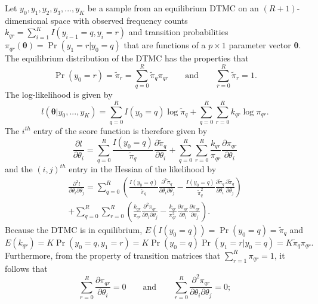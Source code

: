 \documentclass[11pt]{article}
\newcommand{\bs}{\boldsymbol}
\begin{document}
Let $y_0,y_1,y_2,y_3,...,y_K$ be a sample from an equilibrium DTMC on an $(R+1)$-dimensional space with observed frequency counts $k_{qr} = \sum_{i=1}^K I(y_{i-1} = q, y_i = r)$ and transition probabilities $\pi_{qr} (\bs\theta) = \Pr(y_1 = r | y_0 = q)$ that are functions of a $p\times 1$ parameter vector $\bs\theta$. The equilibrium distribution of the DTMC has the properties that
\begin{equation}
\label{eq:balancing_normalizing}
 \Pr(y_0 = r) = \tilde{\pi}_r = \sum_{q=0}^R \tilde{\pi}_q \pi_{qr} \qquad \text{and} \qquad \sum_{r=0}^R \tilde{\pi}_r = 1.
\end{equation}
The log-likelihood is given by 
\begin{equation}
\label{eq:log_lik}
l(\bs\theta | y_0,...,y_K) = \sum_{q=0}^R I(y_0 = q) \log \tilde{\pi}_q + \sum_{q=0}^R \sum_{r=0}^R k_{qr} \log \pi_{qr}.
\end{equation}
The $i^{th}$ entry of the score function is therefore given by
\begin{equation}
\label{eq:score}
\frac{\partial l}{\partial \theta_i} = \sum_{q=0}^R \frac{I(y_0 = q)}{\tilde{\pi}_q} \frac{\partial \tilde{\pi}_q}{\partial \theta_i} +  \sum_{q=0}^R \sum_{r=0}^R \frac{k_{qr}}{\pi_{qr}} \frac{\partial \pi_{qr}}{\partial \theta_i}
\end{equation}
and the $(i,j)^{th}$ entry in the Hessian of the likelihood by
\begin{multline}
\label{eq:info_observed}
\frac{\partial^2 l}{\partial \theta_i \partial \theta_j} = \sum_{q=0}^R \left(\frac{I(y_0 = q)}{\tilde{\pi}_q} \frac{\partial^2 \tilde{\pi}_q}{\partial \theta_i \partial \theta_j} - \frac{I(y_0 = q)}{\tilde{\pi}_q^2} \frac{\partial \tilde{\pi}_q}{\partial \theta_i} \frac{\partial \tilde{\pi}_q}{\partial \theta_j}\right) \\
 +  \sum_{q=0}^R \sum_{r=0}^R \left(\frac{k_{qr}}{\pi_{qr}} \frac{\partial^2 \pi_{qr}}{\partial \theta_i \partial \theta_j} - \frac{k_{qr}}{\pi_{qr}^2} \frac{\partial \pi_{qr}}{\partial \theta_i}  \frac{\partial \pi_{qr}}{\partial \theta_j} \right).
\end{multline}
Because the DTMC is in equilibrium, $E(I(y_0 = q)) = \Pr(y_0 = q) = \tilde{\pi}_q$ and \[
E(k_{qr}) = K \Pr(y_0 = q, y_1 = r) = K \Pr(y_0 = q) \Pr(y_1 = r | y_0 = q) = K \tilde{\pi}_q \pi_{qr}. \]
Furthermore, from the property of transition matrices that $\sum_{r=1}^R \pi_{qr} = 1$, it follows that \[
\sum_{r=0}^R \frac{\partial \pi_{qr}}{\partial \theta_i} = 0 \qquad \text{and} \qquad \sum_{r=0}^R \frac{\partial^2 \pi_{qr}}{\partial \theta_i \partial \theta_j} = 0; \]
\end{document}
